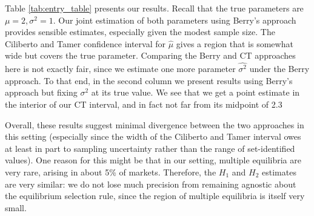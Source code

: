\documentclass{article}
\begin{document}
\begin{enumerate}
\begin{answer}
\begin{table}[H]
\end{table}

Table \ref{tab:entry_table} presents our results. Recall that the true parameters are $\mu=2, \sigma^2=1$. Our joint estimation of both parameters using Berry's approach provides sensible estimates, especially given the modest sample size. The Ciliberto and Tamer confidence interval for $\hat{\mu}$ gives a region that is somewhat wide but covers the true parameter. Comparing the Berry and CT approaches here is not exactly fair, since we estimate one more parameter $\hat{\sigma^2}$ under the Berry approach. To that end, in the second column we present results using Berry's approach but fixing $\sigma^2$ at its true value. We see that we get a point estimate in the interior of our CT interval, and in fact not far from its midpoint of 2.3


Overall, these results suggest minimal divergence between the two approaches in this setting (especially since the width of the Ciliberto and Tamer interval owes at least in part to sampling uncertainty rather than the range of set-identified values). One reason for this might be that in our setting, multiple equilibria are very rare, arising in about 5\% of markets. Therefore, the $H_1$ and $H_2$ estimates are very similar: we do not lose much precision from remaining agnostic about the equilibrium selection rule, since the region of multiple equilibria is itself very small. 
\end{answer}
\end{enumerate}
\end{document}
